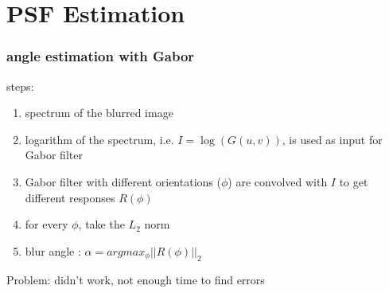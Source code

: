 \section[PSF Estimat.]{PSF Estimation}
\begin{frame}
	\frametitle{angle estimation with Gabor}
	steps:
	\begin{enumerate}
	\item spectrum of the blurred image
	\item logarithm of the spectrum, i.e. $I=\log(G(u,v))$, is used as input for Gabor filter
	\item Gabor filter with different orientations ($\phi$) are convolved with $I$ to get different responses $R(\phi)$
	\item for every $\phi$, take the $L_2$ norm
	\item blur angle : $\alpha = arg{max_{\phi}||R(\phi)||_2}$
	\end{enumerate}
	
	Problem: didn't work, not enough time to find errors
\end{frame}